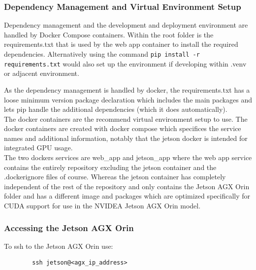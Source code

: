 \documentclass{article}
\begin{document}
	\subsubsection{Dependency Management and Virtual Environment Setup}
	
	Dependency management and the development and deployment environment are handled by Docker Compose containers. Within the root folder is the requirements.txt that is used by the web app container to install the required dependencies. Alternatively using the command \texttt{pip install -r requirements.txt} would also set up the environment if developing within .venv or adjacent environment.
	
	As the dependency management is handled by docker, the requirements.txt has a loose minimum version package declaration which includes the main packages and lets pip handle the additional dependencies (which it does automatically). \\
	
	The docker containers are the recommend virtual environment setup to use. The docker containers are created with docker compose which specifices the service names and additional information, notably that the jetson docker is intended for integrated GPU usage.\\
	
	The two dockers services are web\_app and jetson\_app where the web app service contains the entirely repository excluding the jetson container and the .dockerignore files of course. Whereas the jetson container has completely independent of the rest of the repository and only contains the Jetson AGX Orin folder and has a different image and packages which are optimized specifically for CUDA support for use in the NVIDEA Jetson AGX Orin model.
	
	
	\subsubsection{Accessing the Jetson AGX Orin}
	To ssh to the Jetson AGX Orin use:
	\begin{lstlisting}
		ssh jetson@<agx_ip_address>
	\end{lstlisting}
\end{document}

